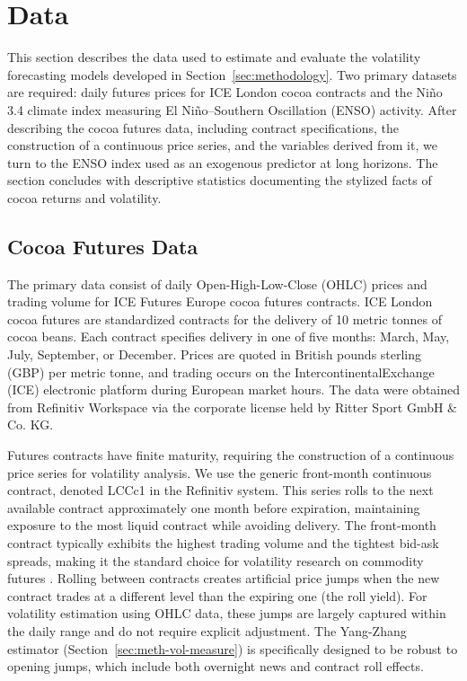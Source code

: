 \section{Data}
\label{sec:data}

This section describes the data used to estimate and evaluate the volatility
forecasting models developed in Section~\ref{sec:methodology}. Two primary
datasets are required: daily futures prices for ICE London cocoa contracts
and the Niño 3.4 climate index measuring El Niño--Southern Oscillation
(ENSO) activity. After describing the cocoa futures data, including
contract specifications, the construction of a continuous price series,
and the variables derived from it, we turn to the ENSO index used as an
exogenous predictor at long horizons. The section concludes with descriptive
statistics documenting the stylized facts of cocoa returns and volatility.

\subsection{Cocoa Futures Data}
\label{sec:data-cocoa}

The primary data consist of daily Open-High-Low-Close (OHLC) prices and
trading volume for ICE Futures Europe cocoa futures contracts. ICE London
cocoa futures are standardized contracts for the delivery
of 10 metric tonnes of cocoa beans. Each contract specifies delivery in one
of five months: March, May, July, September, or December. Prices are quoted
in British pounds sterling (GBP) per metric tonne, and trading occurs on
the IntercontinentalExchange (ICE) electronic platform during European
market hours. The data were obtained from Refinitiv Workspace via the
corporate license held by Ritter Sport GmbH \& Co. KG.

Futures contracts have finite maturity, requiring the construction of a
continuous price series for volatility analysis. We use the generic
front-month continuous contract, denoted LCCc1 in the Refinitiv system.
This series rolls to the next available contract approximately one month
before expiration, maintaining exposure to the most liquid contract while
avoiding delivery. The front-month contract typically exhibits the highest
trading volume and the tightest bid-ask spreads, making it the standard
choice for volatility research on commodity futures
\parencite{degiannakisForecastingRealizedVolatility2022,
alfeusForecastingVolatilityCommodity2022}. Rolling between contracts creates
artificial price jumps when the new contract trades at a different level
than the expiring one (the roll yield). For volatility estimation using
OHLC data, these jumps are largely captured within the daily range and do
not require explicit adjustment. The Yang-Zhang estimator
(Section~\ref{sec:meth-vol-measure}) is specifically designed to be robust
to opening jumps, which include both overnight news and contract roll effects.

